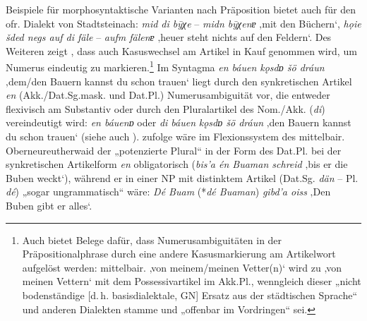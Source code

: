\begin{sloppypar}
Beispiele für morphosyntaktische Varianten nach Präposition bietet auch \citet[§13]{Schübel1955} für den ofr. Dialekt von Stadtsteinach: \textit{mid di bȳχe} -- \textit{midn bȳχenɐ} ‚mit den Büchern‘, \textit{họie šded negs auf di fäle} -- \textit{aufm fälenɐ} ‚heuer steht nichts auf den Feldern‘. Des Weiteren zeigt \citet[§13]{Schübel1955}, dass auch Kasuswechsel am Artikel in Kauf genommen wird, um Numerus eindeutig zu markieren.\footnote{Auch \citet[§12]{Weitzenböck1942} bietet Belege dafür, dass Numerusambiguitäten in der Präpositionalphrase durch eine andere Kasusmarkierung am Artikelwort aufgelöst werden: mittelbair.    ‚von meinem/meinen Vetter(n)‘ wird zu    ‚von meinen Vettern‘ mit dem Possessivartikel im Akk.Pl., wenngleich dieser „nicht bodenständige [d.\,h. basisdialektale, GN] Ersatz aus der städtischen Sprache“ und anderen Dialekten stamme und „offenbar im Vordringen“ sei.} Im Syntagma \textit{en báuen kǫsdɒ šö dráun} ‚dem/den Bauern kannst du schon trauen‘ liegt durch den synkretischen Artikel \textit{en} (Akk./Dat.Sg.mask. und Dat.Pl.) Numerusambiguität vor, die entweder flexivisch am Substantiv oder durch den Pluralartikel des Nom./Akk. (\textit{di}) vereindeutigt wird: \textit{en báuenɒ} oder \textit{di báuen} \textit{kǫsdɒ šö dráun} ‚den Bauern kannst du schon trauen‘ (siehe auch ). \citet[123--124]{Steininger1994} zufolge wäre im Flexionssystem des mittelbair. Oberneureutherwaid der „potenzierte Plural“ in der Form des Dat.Pl. bei der synkretischen Artikelform \textit{en} obligatorisch (\textit{bis’a én Buaman schreid} ‚bis er die Buben weckt‘), während er in einer NP mit distinktem Artikel (Dat.Sg. \textit{dän} -- Pl. \textit{dé}) „sogar ungrammatisch“ wäre: \textit{Dé Buam} (*\textit{dé Buaman}) \textit{gibd’a oiss} ‚Den Buben gibt er alles‘.
\end{sloppypar}

